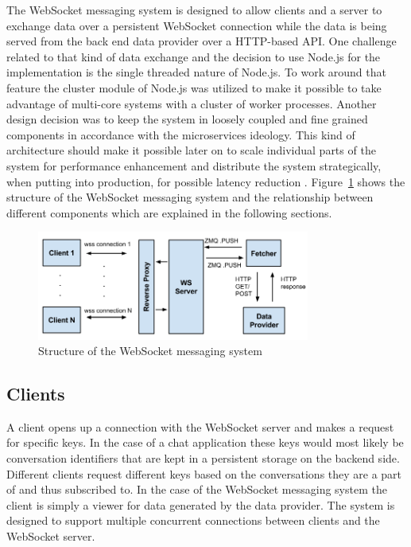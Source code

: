 The WebSocket messaging system is designed to allow clients and a server to exchange data over a persistent WebSocket connection while the data is being served from the back end data provider over a HTTP-based API. One challenge related to that kind of data exchange and the decision to use Node.js for the implementation is the single threaded nature of Node.js. To work around that feature the cluster module of Node.js was utilized to make it possible to take advantage of multi-core systems with a cluster of worker processes. Another design decision was to keep the system in loosely coupled and fine grained components in accordance with the microservices ideology. This kind of architecture should make it possible later on to scale individual parts of the system for performance enhancement and distribute the system strategically, when putting into production, for possible latency reduction \cite{tilkovMicroservices}. Figure~\ref{fig:webSocketMessagingSystem} shows the structure of the WebSocket messaging system and the relationship between different components which are explained in the following sections.
\\
\begin{figure}[h!]
	\centering
	\includegraphics[width=0.8\textwidth]{images/websocketMessagingSystem}
	\caption{Structure of the WebSocket messaging system}
	\label{fig:webSocketMessagingSystem}
\end{figure}

\subsection{Clients}

A client opens up a connection with the WebSocket server and makes a request for specific keys. In the case of a chat application these keys would most likely be conversation identifiers that are kept in a persistent storage on the backend side. Different clients request different keys based on the conversations they are a part of and thus subscribed to. In the case of the WebSocket messaging system the client is simply a viewer for data generated by the data provider. The system is designed to support multiple concurrent connections between clients and the WebSocket server.

